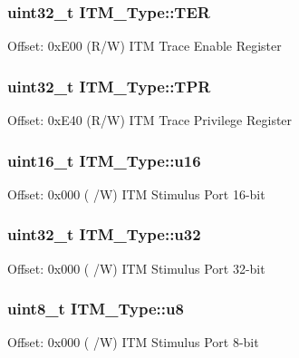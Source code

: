 \subsubsection[{\texorpdfstring{T\+ER}{TER}}]{ uint32\+\_\+t I\+T\+M\+\_\+\+Type\+::\+T\+ER}\hypertarget{struct_i_t_m___type_a91a040e1b162e1128ac1e852b4a0e589}{}\label{struct_i_t_m___type_a91a040e1b162e1128ac1e852b4a0e589}
Offset\+: 0x\+E00 (R/W) I\+TM Trace Enable Register 
\subsubsection[{\texorpdfstring{T\+PR}{TPR}}]{ uint32\+\_\+t I\+T\+M\+\_\+\+Type\+::\+T\+PR}\hypertarget{struct_i_t_m___type_a93b480aac6da620bbb611212186d47fa}{}\label{struct_i_t_m___type_a93b480aac6da620bbb611212186d47fa}
Offset\+: 0x\+E40 (R/W) I\+TM Trace Privilege Register 
\subsubsection[{\texorpdfstring{u16}{u16}}]{ uint16\+\_\+t I\+T\+M\+\_\+\+Type\+::u16}\hypertarget{struct_i_t_m___type_a12aa4eb4d9dcb589a5d953c836f4e8f4}{}\label{struct_i_t_m___type_a12aa4eb4d9dcb589a5d953c836f4e8f4}
Offset\+: 0x000 ( /W) I\+TM Stimulus Port 16-\/bit 
\subsubsection[{\texorpdfstring{u32}{u32}}]{ uint32\+\_\+t I\+T\+M\+\_\+\+Type\+::u32}\hypertarget{struct_i_t_m___type_a6882fa5af67ef5c5dfb433b3b68939df}{}\label{struct_i_t_m___type_a6882fa5af67ef5c5dfb433b3b68939df}
Offset\+: 0x000 ( /W) I\+TM Stimulus Port 32-\/bit 
\subsubsection[{\texorpdfstring{u8}{u8}}]{ uint8\+\_\+t I\+T\+M\+\_\+\+Type\+::u8}\hypertarget{struct_i_t_m___type_abea77b06775d325e5f6f46203f582433}{}\label{struct_i_t_m___type_abea77b06775d325e5f6f46203f582433}
Offset\+: 0x000 ( /W) I\+TM Stimulus Port 8-\/bit 

